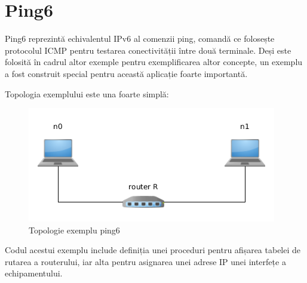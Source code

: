 \documentclass[12pt, a4paper, oneside, romanian]{teza-upb}
\begin{document}
\chapter{Ping6}
Ping6 reprezintă echivalentul IPv6 al comenzii ping, comandă ce folosește protocolul ICMP pentru testarea conectivității între două terminale. Deși este folosită în cadrul altor exemple pentru exemplificarea altor concepte, un exemplu a fost construit special pentru această aplicație foarte importantă. 

Topologia exemplului este una foarte simplă:

\begin{figure}[H]
\centering
\includegraphics*[scale=0.65]{img/ping6.png}
\caption{Topologie exemplu ping6}
\label{fig:punguta}
\end{figure}

Codul acestui exemplu include definiția unei proceduri pentru afișarea tabelei de rutarea a routerului, iar alta pentru asignarea unei adrese IP unei interfețe a echipamentului.
\end{document}
